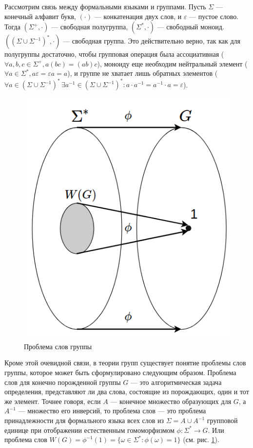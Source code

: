 \documentclass[14pt]{matmex-diploma-custom}
\begin{document}
Рассмотрим связь между формальными языками и группами. 
Пусть $\Sigma$ --- конечный алфавит букв, $(\cdot)$ --- конкатенация двух слов, 
и $\varepsilon$ --- пустое слово.
Тогда $(\Sigma^+, \cdot)$ --- свободная полугруппа, $(\Sigma^*, \cdot)$ --- свободный моноид. 
$((\Sigma \cup \Sigma^{-1})^*, \cdot)$ --- свободная группа. Это действительно верно, так как для 
полугруппы достаточно, чтобы групповая операция была ассоциативная 
($\forall a, b, c \in \Sigma^+, a(bc)=(ab)c$), моноиду еще необходим нейтральный элемент 
($\forall a \in \Sigma^*, a\varepsilon=\varepsilon a = a$), и группе не хватает лишь обратных элементов
($\forall a \in (\Sigma \cup \Sigma^{-1})^* \, 
\exists a^{-1} \in (\Sigma \cup \Sigma^{-1})^* : a \cdot a^{-1} = a^{-1} \cdot a = \varepsilon$).
\begin{figure}[H]
\centering
  \includegraphics[width=0.5\linewidth]{pics/3.png}
  \caption{Проблема слов группы}
  \label{fig:word_problem}
\end{figure}
Кроме этой очевидной связи, в теории групп существует понятие проблемы слов группы,
которое может быть сформулировано следующим образом. 
Проблема слов для конечно порожденной группы $G$ --- это алгоритмическая задача определения, 
представляют ли два слова, состоящие из порождающих, один и тот же элемент. 
Точнее говоря, если $A$ --- конечное множество образующих для $G$, а $A^{-1}$ --- множество его инверсий, 
то проблема слов --- это проблема принадлежности для формального языка всех слов из 
$\Sigma=A \cup A^{-1}$ групповой единице при отображении естественным гомоморфизмом
$\phi : \Sigma^* \to G$. Или проблема слов $W(G) = \phi^{-1}(1) = 
\{ \omega \in \Sigma^* : \phi(\omega) = 1 \}$ 
(см. рис. \ref{fig:word_problem}).
\end{document}
